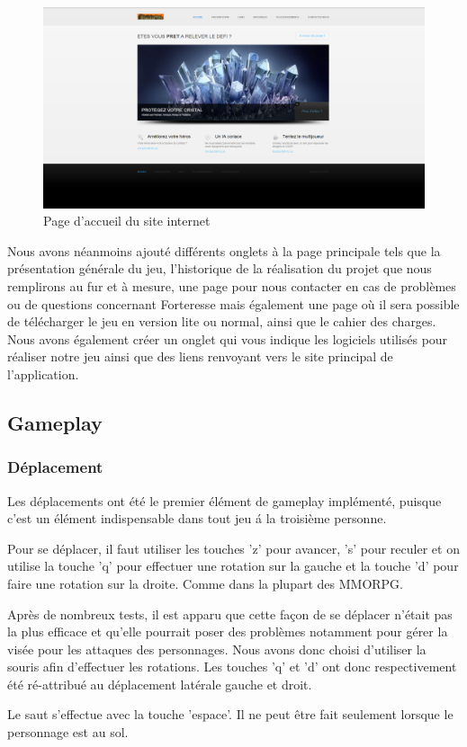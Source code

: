\documentclass[a4paper, 12pt]{article}
\begin{document}
	\begin{figure}[!ht]
		\centerline{\includegraphics[scale=0.3]{siteprojet.png}}
		\caption*{Page d'accueil du site internet}
	\end{figure}	 
	 
	 Nous avons néanmoins ajouté différents onglets à la page principale tels que la présentation générale du jeu, l’historique de la réalisation du projet que nous remplirons au fur et à mesure, une page pour nous contacter en cas de problèmes ou de questions concernant Forteresse mais également une page où il sera possible de télécharger le jeu en version lite ou normal, ainsi que le cahier des charges. Nous avons également créer un onglet qui vous indique les logiciels utilisés pour réaliser notre jeu ainsi que des liens renvoyant vers le site principal de l’application.

	\subsection{Gameplay}
		\subsubsection{Déplacement}
		Les déplacements ont été le premier élément de gameplay implémenté, puisque c'est un élément indispensable dans tout jeu \'a la troisième personne.
		\par Pour se déplacer, il faut utiliser les touches 'z' pour avancer, 's' pour reculer et on utilise la touche 'q' pour effectuer une rotation sur la gauche et la touche 'd' pour faire une rotation sur la droite. Comme dans la plupart des MMORPG.
		\par Après de nombreux tests, il est apparu que cette façon de se déplacer n'était pas la plus efficace et qu'elle pourrait poser des problèmes notamment pour gérer la visée pour les attaques des personnages. Nous avons donc choisi d'utiliser la souris afin d'effectuer les rotations. Les touches 'q' et 'd' ont donc respectivement été ré-attribué au déplacement latérale gauche et droit.
		\par Le saut s'effectue avec la touche 'espace'. Il ne peut être fait seulement lorsque le personnage est au sol.  
\end{document}
